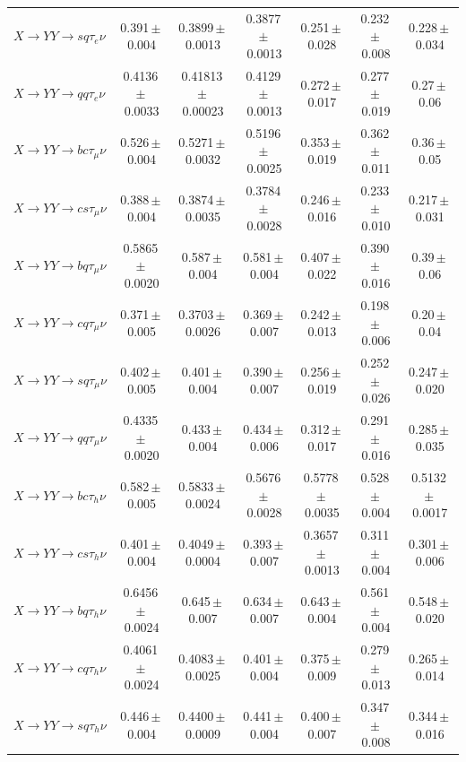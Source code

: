 \documentclass[12pt]{article}   %
\begin{document}
\begin{landscape}
{\begin{longtable}{@{\extracolsep{\fill}}lcccccc@{}}
$X\to YY\to sq\tau_e\nu$ & 0.391\,$\pm$\,0.004 & 0.3899\,$\pm$\,0.0013 & 0.3877\,$\pm$\,0.0013 & 0.251\,$\pm$\,0.028 & 0.232\,$\pm$\,0.008 & 0.228\,$\pm$\,0.034 \\
$X\to YY\to qq\tau_e\nu$ & 0.4136\,$\pm$\,0.0033 & 0.41813\,$\pm$\,0.00023 & 0.4129\,$\pm$\,0.0013 & 0.272\,$\pm$\,0.017 & 0.277\,$\pm$\,0.019 & 0.27\,$\pm$\,0.06 \\
$X\to YY\to bc\tau_\mu\nu$ & 0.526\,$\pm$\,0.004 & 0.5271\,$\pm$\,0.0032 & 0.5196\,$\pm$\,0.0025 & 0.353\,$\pm$\,0.019 & 0.362\,$\pm$\,0.011 & 0.36\,$\pm$\,0.05 \\
$X\to YY\to cs\tau_\mu\nu$ & 0.388\,$\pm$\,0.004 & 0.3874\,$\pm$\,0.0035 & 0.3784\,$\pm$\,0.0028 & 0.246\,$\pm$\,0.016 & 0.233\,$\pm$\,0.010 & 0.217\,$\pm$\,0.031 \\
$X\to YY\to bq\tau_\mu\nu$ & 0.5865\,$\pm$\,0.0020 & 0.587\,$\pm$\,0.004 & 0.581\,$\pm$\,0.004 & 0.407\,$\pm$\,0.022 & 0.390\,$\pm$\,0.016 & 0.39\,$\pm$\,0.06 \\
$X\to YY\to cq\tau_\mu\nu$ & 0.371\,$\pm$\,0.005 & 0.3703\,$\pm$\,0.0026 & 0.369\,$\pm$\,0.007 & 0.242\,$\pm$\,0.013 & 0.198\,$\pm$\,0.006 & 0.20\,$\pm$\,0.04 \\
$X\to YY\to sq\tau_\mu\nu$ & 0.402\,$\pm$\,0.005 & 0.401\,$\pm$\,0.004 & 0.390\,$\pm$\,0.007 & 0.256\,$\pm$\,0.019 & 0.252\,$\pm$\,0.026 & 0.247\,$\pm$\,0.020 \\
$X\to YY\to qq\tau_\mu\nu$ & 0.4335\,$\pm$\,0.0020 & 0.433\,$\pm$\,0.004 & 0.434\,$\pm$\,0.006 & 0.312\,$\pm$\,0.017 & 0.291\,$\pm$\,0.016 & 0.285\,$\pm$\,0.035 \\
\midrule
$X\to YY\to bc\tau_h\nu$ & 0.582\,$\pm$\,0.005 & 0.5833\,$\pm$\,0.0024 & 0.5676\,$\pm$\,0.0028 & 0.5778\,$\pm$\,0.0035 & 0.528\,$\pm$\,0.004 & 0.5132\,$\pm$\,0.0017 \\
$X\to YY\to cs\tau_h\nu$ & 0.401\,$\pm$\,0.004 & 0.4049\,$\pm$\,0.0004 & 0.393\,$\pm$\,0.007 & 0.3657\,$\pm$\,0.0013 & 0.311\,$\pm$\,0.004 & 0.301\,$\pm$\,0.006 \\
$X\to YY\to bq\tau_h\nu$ & 0.6456\,$\pm$\,0.0024 & 0.645\,$\pm$\,0.007 & 0.634\,$\pm$\,0.007 & 0.643\,$\pm$\,0.004 & 0.561\,$\pm$\,0.004 & 0.548\,$\pm$\,0.020 \\
$X\to YY\to cq\tau_h\nu$ & 0.4061\,$\pm$\,0.0024 & 0.4083\,$\pm$\,0.0025 & 0.401\,$\pm$\,0.004 & 0.375\,$\pm$\,0.009 & 0.279\,$\pm$\,0.013 & 0.265\,$\pm$\,0.014 \\
$X\to YY\to sq\tau_h\nu$ & 0.446\,$\pm$\,0.004 & 0.4400\,$\pm$\,0.0009 & 0.441\,$\pm$\,0.004 & 0.400\,$\pm$\,0.007 & 0.347\,$\pm$\,0.008 & 0.344\,$\pm$\,0.016 \\

\end{longtable}}
\end{landscape}
\end{document}
